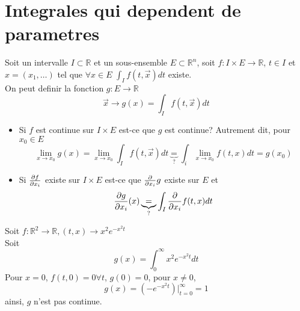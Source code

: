 \documentclass[../main.tex]{subfiles}
\begin{document}
\section{Integrales qui dependent de parametres}

Soit un intervalle $I\subset \mathbb{R}$ et un sous-ensemble $E\subset \mathbb{R}^n$, soit $f: I\times E \to \mathbb{R}$, $t\in I$ et $x = ( x_1,\ldots) $ tel que $\forall x \in E$ $\int_I f( t,\vec{x}) dt$ existe.\\
On peut definir la fonction $g:E \to \mathbb{R}$ 
\[ 
	\vec{x} \to g( x) = \int_{ I } f( t,\vec{x}) dt
\]
\begin{itemize}
\item Si $f$ est continue sur $I\times E$ est-ce que $g$ est continue?
Autrement dit, pour $x_0\in E$ 
\[ 
	\lim_{x \to x_0} g( x) = \lim_{x \to x_0} \int_I f( t,\vec{x}) dt \underbrace{=}_{?} \int_i \lim_{x \to x_0} f( t,x) dt = g( x_0) 
\]
\item Si $\frac{\partial f}{\partial x_i}$ existe sur $I\times E$ est-ce que $\frac{\partial }{\partial x_i }g$ existe sur $E$ et 
	\[ 
		\frac{\partial g}{\partial x_i}( x) \underbrace{=}_{?} \int_I \frac{\partial }{\partial x_i} f( t,x)  dt
	\]
\end{itemize}
\begin{exemple}
	Soit $f: \mathbb{R}^{2}\to \mathbb{R},  ( t,x) \to x^{2} e^{- x^{2} t} $\\
	Soit
	\[ 
		g( x) = \int_{ 0 }^{ \infty  } x^{2} e^{-x^{2}t} dt
	\]
	Pour $x=0$, $f( t,0) =0 \forall t$, $g( 0) =0$, pour $x\neq 0$,
	\[ 
		g( x) = ( - e^{-x^{2} t} ) \vert_{t=0}^{ \infty } =1
	\]
ainsi, $g$ n'est pas continue.	
\end{exemple}
\end{document}
